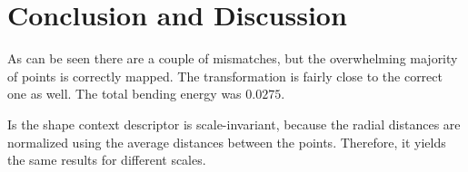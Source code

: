 \documentclass[12pt]{article}
\begin{document}
\section{Conclusion and Discussion}

As can be seen there are a couple of mismatches, but the overwhelming majority of points is correctly mapped. The transformation is fairly close to the correct one as well. The total bending energy was $0.0275$.

Is the shape context descriptor is scale-invariant, because the radial distances are normalized using the average distances between the points. Therefore, it yields the same results for different scales.  
\end{document}

